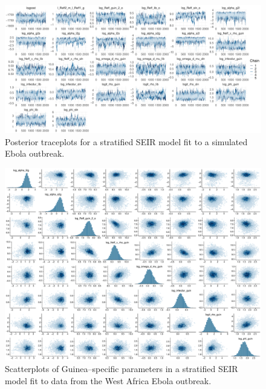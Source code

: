 \begin{figure}
	\centering
	\includegraphics[width=\linewidth]{figures/ebola_joint_traces}
	\caption{Posterior traceplots for a stratified SEIR model fit to a simulated Ebola outbreak.}
	\label{fig:ebolajointtraces}
\end{figure}

\begin{figure}[htbp]
	\centering
	\includegraphics[width=\linewidth]{figures/ebola_joint_pairs_guin}
	\caption{Scatterplots of Guinea--specific parameters in a stratified SEIR model fit to data from the West Africa Ebola outbreak.}
\end{figure}

